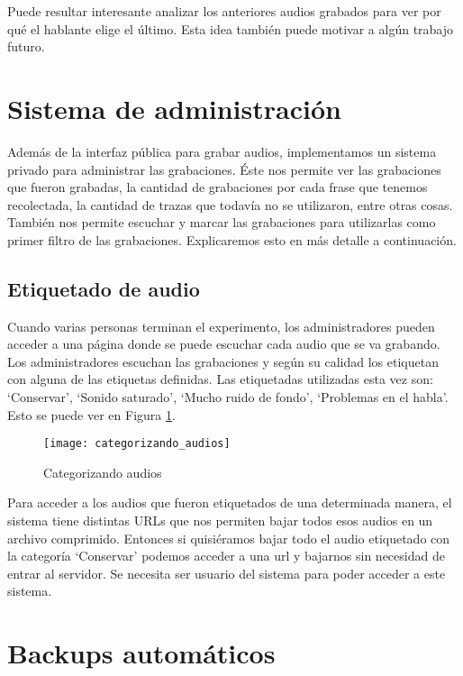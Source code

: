 Puede resultar interesante analizar los anteriores audios grabados para ver por qué el hablante elige el último. Esta idea también puede motivar a algún trabajo futuro.

\section{Sistema de administración}

Además de la interfaz pública para grabar audios, implementamos un sistema privado para administrar las grabaciones. Éste nos permite ver las grabaciones que fueron grabadas, la cantidad de grabaciones por cada frase que tenemos recolectada, la cantidad de trazas que todavía no se utilizaron, entre otras cosas. También nos permite escuchar y marcar las grabaciones para utilizarlas como primer filtro de las grabaciones. Explicaremos esto en más detalle a continuación.

\subsection{Etiquetado de audio}

Cuando varias personas terminan el experimento, los administradores pueden acceder a una página donde se puede escuchar cada audio que se va grabando. Los administradores escuchan las grabaciones y según su calidad los etiquetan con alguna de las etiquetas definidas. Las etiquetadas utilizadas esta vez son: `Conservar’,  `Sonido saturado’, `Mucho ruido de fondo’, `Problemas en el habla’. Esto se puede ver en Figura \ref{cat}.

\begin{figure}[h!]
    \centerline{\texttt{[image: categorizando\_audios]} }
    \caption{Categorizando audios}
    \label{cat}
\end{figure}

Para acceder a los audios que fueron etiquetados de una determinada manera, el sistema tiene distintas URLs que nos permiten bajar todos esos audios en un archivo comprimido. Entonces si quisiéramos bajar todo el audio etiquetado con la categoría `Conservar’ podemos acceder a una url y bajarnos sin necesidad de entrar al servidor. Se necesita ser usuario del sistema para poder acceder a este sistema.

\section{Backups automáticos}


